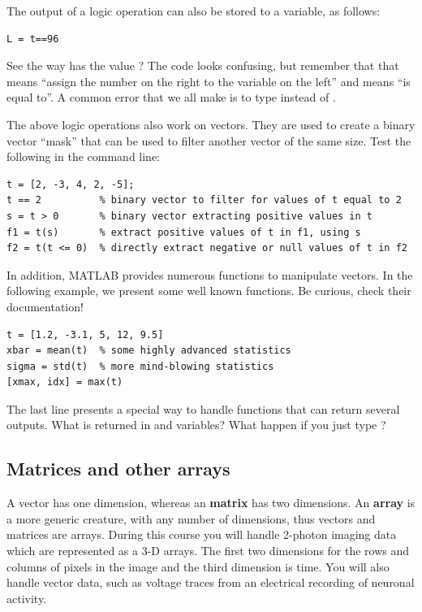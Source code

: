 \documentclass{article}
\begin{document}
The output of a logic operation can also be stored to a variable, as follows:

\begin{lstlisting}
L = t==96
\end{lstlisting}

See the way  has the value ?
The code looks confusing, but remember that that \mcode{=} means ``assign the number on the right to the variable on the left'' and \mcode{==} means ``is equal to''.
A common error that we all make is to type  instead of .

The above logic operations also work on vectors.
They are used to create a binary vector ``mask'' that can be used to filter another vector of the same size.
Test the following in the command line:
\begin{lstlisting}
t = [2, -3, 4, 2, -5];
t == 2          % binary vector to filter for values of t equal to 2
s = t > 0       % binary vector extracting positive values in t
f1 = t(s)       % extract positive values of t in f1, using s
f2 = t(t <= 0)  % directly extract negative or null values of t in f2
\end{lstlisting}

In addition,  MATLAB provides numerous functions to manipulate vectors.
In the following example, we present some well known functions.
Be curious, check their documentation!
\begin{lstlisting}
t = [1.2, -3.1, 5, 12, 9.5]
xbar = mean(t)  % some highly advanced statistics
sigma = std(t)  % more mind-blowing statistics
[xmax, idx] = max(t)
\end{lstlisting}
The last line presents a special way to handle functions that can return several outputs.
What is returned in  and  variables?
What happen if you just type ?


\pagebreak
\subsection{Matrices and other arrays}

A vector has one dimension, whereas an \textbf{matrix} has two dimensions.
An \textbf{array} is a more generic creature, with any number of dimensions, thus vectors and matrices are arrays.
During this course you will handle 2-photon imaging data which are represented as a 3-D arrays.
The first two dimensions for the rows and columns of pixels in the image and the third dimension is time.
You will also handle vector data, such as voltage traces from an electrical recording of neuronal activity.
\end{document}
